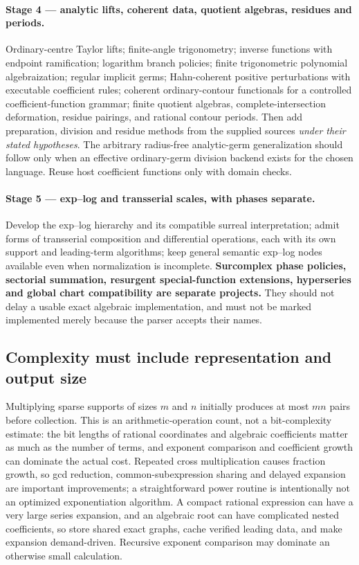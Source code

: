\documentclass[11pt,letterpaper]{article}
\numberwithin{equation}{section}
\theoremstyle{definition}
\theoremstyle{remark}
\begin{document}
\paragraph{Stage 4 --- analytic lifts, coherent data, quotient algebras, residues and periods.}
Ordinary-centre Taylor lifts; finite-angle trigonometry; inverse functions with
endpoint ramification; logarithm branch policies; finite trigonometric
polynomial algebraization; regular implicit germs; Hahn-coherent positive
perturbations with executable coefficient rules; coherent ordinary-contour
functionals for a controlled coefficient-function grammar; finite quotient
algebras, complete-intersection deformation, residue pairings, and rational
contour periods. Then add preparation, division and residue methods from the
supplied sources \emph{under their stated hypotheses}. The arbitrary radius-free
analytic-germ generalization should follow only when an effective ordinary-germ
division backend exists for the chosen language. Reuse host coefficient
functions only with domain checks.

\paragraph{Stage 5 --- exp--log and transserial scales, with phases separate.}
Develop the exp--log hierarchy and its compatible surreal interpretation; admit
forms of transserial composition and differential operations, each with its own
support and leading-term algorithms; keep general semantic exp--log nodes
available even when normalization is incomplete. \textbf{Surcomplex phase
policies, sectorial summation, resurgent special-function extensions,
hyperseries and global chart compatibility are separate projects.} They should
not delay a usable exact algebraic implementation, and must not be marked
implemented merely because the parser accepts their names.

\subsection{Complexity must include representation and output size}
\label{cas:sub-complexity}
Multiplying sparse supports of sizes $m$ and $n$ initially produces at most $mn$
pairs before collection. This is an arithmetic-operation count, not a
bit-complexity estimate: the bit lengths of rational coordinates and algebraic
coefficients matter as much as the number of terms, and exponent comparison and
coefficient growth can dominate the actual cost. Repeated cross multiplication
causes fraction growth, so gcd reduction, common-subexpression sharing and
delayed expansion are important improvements; a straightforward power routine is
intentionally not an optimized exponentiation algorithm. A compact rational
expression can have a very large series expansion, and an algebraic root can
have complicated nested coefficients, so store shared exact graphs, cache
verified leading data, and make expansion demand-driven. Recursive exponent
comparison may dominate an otherwise small calculation.
\end{document}
